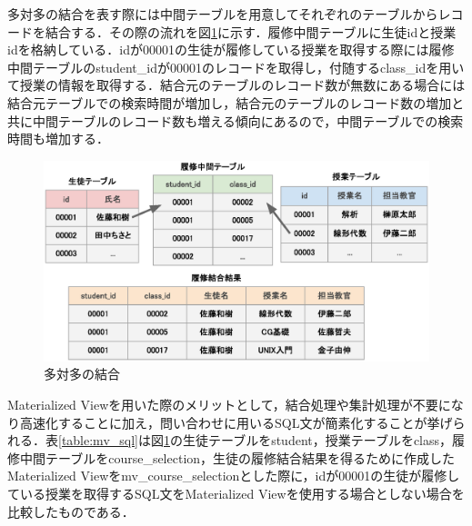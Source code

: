 \documentclass[a4paper,11pt]{ujreport}
\begin{document}
多対多の結合を表す際には中間テーブルを用意してそれぞれのテーブルからレコードを結合する．その際の流れを図\ref{figure:MvDescription2}に示す．履修中間テーブルに生徒idと授業idを格納している．idが00001の生徒が履修している授業を取得する際には履修中間テーブルのstudent\_idが00001のレコードを取得し，付随するclass\_idを用いて授業の情報を取得する．結合元のテーブルのレコード数が無数にある場合には結合元テーブルでの検索時間が増加し，結合元のテーブルのレコード数の増加と共に中間テーブルのレコード数も増える傾向にあるので，中間テーブルでの検索時間も増加する．
\begin{figure}[htbp]
	\begin{center}
		\includegraphics[width=32em, trim=0 5em 0 0]{src/MvDescription2.eps} %
	\end{center}
	\caption{多対多の結合}
	\label{figure:MvDescription2}
\end{figure}
Materialized Viewを用いた際のメリットとして，結合処理や集計処理が不要になり高速化することに加え，問い合わせに用いるSQL文が簡素化することが挙げられる．表\ref{table:mv_sql}は図\ref{figure:MvDescription2}の生徒テーブルをstudent，授業テーブルをclass，履修中間テーブルをcourse\_selection，生徒の履修結合結果を得るために作成したMaterialized Viewをmv\_course\_selectionとした際に，idが00001の生徒が履修している授業を取得するSQL文をMaterialized Viewを使用する場合としない場合を比較したものである．
\end{document}
